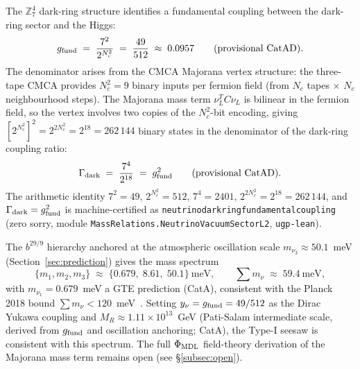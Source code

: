 \documentclass[12pt,a4paper]{article}
\theoremstyle{definition}
\theoremstyle{remark}
\newcommand{\lean}[1]{%
  \penalty-100
  \begingroup\def\_{\textunderscore\allowbreak}\texttt{#1}\endgroup}
\begin{document}
The $\mathbb{Z}_7^4$ dark-ring structure identifies a fundamental coupling
between the dark-ring sector and the Higgs:
\begin{equation}
  g_{\rm fund} \;=\; \frac{7^2}{2^{N_c^2}} \;=\; \frac{49}{512}
  \;\approx\; 0.0957
  \qquad \text{(provisional CatAD).}
  \label{eq:g_fund}
\end{equation}
The denominator arises from the CMCA Majorana vertex structure:
the three-tape CMCA provides $N_c^2 = 9$ binary inputs per fermion field
(from $N_c$ tapes $\times$ $N_c$ neighbourhood steps).
The Majorana mass term $\nu_L^T C \nu_L$ is bilinear in the fermion field,
so the vertex involves two copies of the $N_c^2$-bit encoding, giving
$[2^{N_c^2}]^2 = 2^{2N_c^2} = 2^{18} = 262\,144$ binary states in the
denominator of the dark-ring coupling ratio:
\begin{equation}
  \Gamma_{\rm dark} \;=\; \frac{7^4}{2^{18}} \;=\; g_{\rm fund}^2
  \qquad \text{(provisional CatAD).}
  \label{eq:gamma_dark}
\end{equation}
The arithmetic identity $7^2 = 49$, $2^{N_c^2} = 512$, $7^4 = 2401$,
$2^{2N_c^2} = 2^{18} = 262\,144$, and $\Gamma_{\rm dark} = g_{\rm fund}^2$
is machine-certified as
\lean{neutrino\_dark\_ring\_fundamental\_coupling} (zero sorry,
module \texttt{MassRelations.NeutrinoVacuumSectorL2}, \texttt{ugp-lean}).

The $b^{29/9}$ hierarchy anchored at the atmospheric oscillation scale
$m_{\nu_3} \approx 50.1$~meV (Section~\ref{sec:prediction}) gives the mass spectrum
\begin{equation}
  \{m_1, m_2, m_3\} \;\approx\; \{0.679,\;8.61,\;50.1\}~\text{meV},
  \qquad \sum m_\nu \;\approx\; 59.4~\text{meV},
  \label{eq:dark_ring_masses}
\end{equation}
with $m_{\nu_1} = 0.679$~meV a GTE prediction (CatA), consistent with the Planck 2018
bound $\sum m_\nu < 120$~meV~\cite{Planck2018}.
Setting $y_\nu = g_{\rm fund} = 49/512$ as the Dirac Yukawa coupling
and $M_R \approx 1.11\times10^{13}$~GeV (Pati-Salam intermediate scale,
derived from $g_{\rm fund}$ and oscillation anchoring; CatA), the
Type-I seesaw is consistent with this spectrum.
The full $\Phi_{\rm MDL}$ field-theory derivation of the Majorana mass term
remains open (see \S\ref{subsec:open}).
\end{document}
